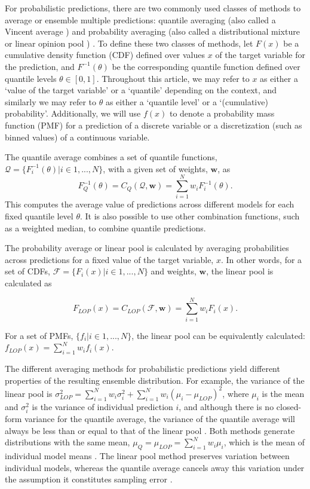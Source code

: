 \documentclass[
  article,
  shortnames,
  notitle]{jss}
\begin{document}
For probabilistic predictions, there are two commonly used classes of
methods to average or ensemble multiple predictions: quantile averaging
(also called a Vincent average \citep{vincent1912}) and probability
averaging (also called a distributional mixture or linear opinion pool
\citep{stone1961}) \citep{lichtendahl2013}. To define these two classes
of methods, let \(F(x)\) be a cumulative density function (CDF) defined
over values \(x\) of the target variable for the prediction, and
\(F^{-1}(\theta)\) be the corresponding quantile function defined over
quantile levels \(\theta \in [0, 1]\). Throughout this article, we may
refer to \(x\) as either a `value of the target variable' or a
`quantile' depending on the context, and similarly we may refer to
\(\theta\) as either a `quantile level' or a `(cumulative) probability'.
Additionally, we will use \(f(x)\) to denote a probability mass function
(PMF) for a prediction of a discrete variable or a discretization (such
as binned values) of a continuous variable.

The quantile average combines a set of quantile functions,
\(\mathcal{Q} = \{F_i^{-1}(\theta)| i \in 1,...,N \}\), with a given set
of weights, \(\pmb{w}\), as \[
F^{-1}_Q(\theta) = C_Q(\mathcal{Q}, \pmb{w}) = \sum_{i = 1}^Nw_iF^{-1}_i(\theta).
\]This computes the average value of predictions across different models
for each fixed quantile level \(\theta\). It is also possible to use
other combination functions, such as a weighted median, to combine
quantile predictions.

The probability average or linear pool is calculated by averaging
probabilities across predictions for a fixed value of the target
variable, \(x\). In other words, for a set of CDFs,
\(\mathcal{F} = \{F_i(x)| i \in 1,...,N \}\) and weights, \(\pmb{w}\),
the linear pool is calculated as

\[
F_{LOP}(x) = C_{LOP}(\mathcal{F}, \pmb{w}) = \sum_{i = 1}^Nw_iF_i(x). 
\]

For a set of PMFs, \(\{f_i|i \in 1, ..., N\}\), the linear pool can be
equivalently calculated: \(f_{LOP}(x) = \sum_{i = 1}^N w_i f_i(x)\).

The different averaging methods for probabilistic predictions yield
different properties of the resulting ensemble distribution. For
example, the variance of the linear pool is
\(\sigma^2_{LOP} = \sum_{i=1}^Nw_i\sigma_i^2 + \sum_{i=1}^Nw_i(\mu_i-\mu_{LOP})^2\),
where \(\mu_i\) is the mean and \(\sigma^2_i\) is the variance of
individual prediction \(i\), and although there is no closed-form
variance for the quantile average, the variance of the quantile average
will always be less than or equal to that of the linear pool
\citep{lichtendahl2013}. Both methods generate distributions with the
same mean, \(\mu_Q = \mu_{LOP} = \sum_{i=1}^Nw_i\mu_i\), which is the
mean of individual model means \citep{lichtendahl2013}. The linear pool
method preserves variation between individual models, whereas the
quantile average cancels away this variation under the assumption it
constitutes sampling error \citep{howerton2023}.
\end{document}
